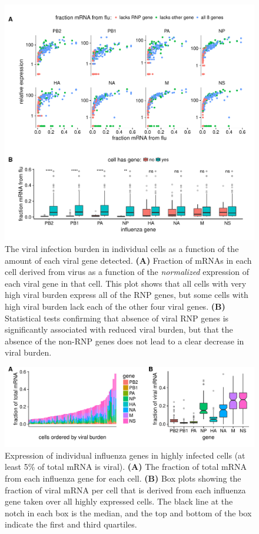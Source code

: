 \documentclass[9pt,lineno]{elife}
\begin{document}
\begin{figure}
\includegraphics[width=\linewidth]{figures/p_flu_burden_flu_gene_merge.pdf}
\caption{
The viral infection burden in individual cells as a function of the amount of each viral gene detected.
{\bf (A)} 
Fraction of mRNAs in each cell derived from virus as a function of the \emph{normalized} expression of each viral gene in that cell.
This plot shows that all cells with very high viral burden express all of the RNP genes, but some cells with high viral burden lack each of the other four viral genes.
{\bf (B)}
Statistical tests confirming that absence of viral RNP genes is significantly associated with reduced viral burden, but that the absence of the non-RNP genes does not lead to a clear decrease in viral burden.
}
\label{fig:fluburdenbyflugene}
\end{figure}

\begin{figure}
\includegraphics[width=\linewidth]{figures/p_flu_expr.pdf}
\caption{
Expression of individual influenza genes in highly infected cells (at least 5\% of total mRNA is viral).
{\bf (A)} 
The fraction of total mRNA from each influenza gene for each cell.
{\bf (B)}
Box plots showing the fraction of viral mRNA per cell that is derived from each influenza gene taken over all highly expressed cells.
The black line at the notch in each box is the median, and the top and bottom of the box indicate the first and third quartiles.
}
\label{fig:fluexpr}
\end{figure}
\end{document}
